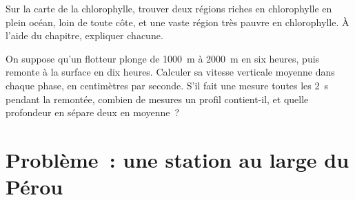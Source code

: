 \begin{exercise}[$\star\star\star$]\label{exo:g10:layered-ocean:14}
Sur la carte de la chlorophylle, trouver deux régions riches en
chlorophylle en plein océan, loin de toute côte, et une vaste région très
pauvre en chlorophylle. À l'aide du chapitre, expliquer chacune.
\end{exercise}

\begin{exercise}[$\star\star\star$]\label{exo:g10:layered-ocean:15}
On suppose qu'un flotteur plonge de \qty{1000}{m} à \qty{2000}{m} en six
heures, puis remonte à la surface en dix heures. Calculer sa vitesse
verticale moyenne dans chaque phase, en centimètres par seconde. S'il fait
une mesure toutes les \qty{2}{s} pendant la remontée, combien de mesures un
profil contient-il, et quelle profondeur en sépare deux en moyenne~?
\end{exercise}

\section{Problème~: une station au large du Pérou}

